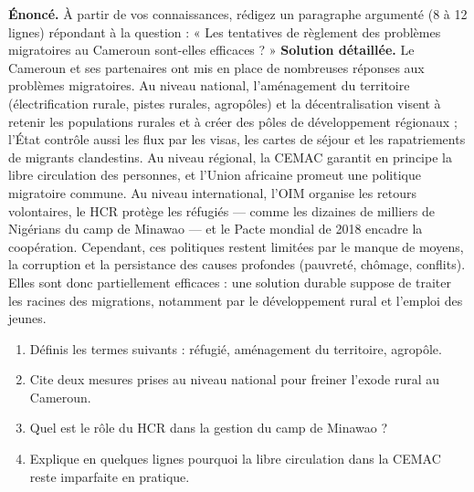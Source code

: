 \documentclass[11pt]{article}
\begin{document}
\begin{exoresolu}
\textbf{Énoncé.} À partir de vos connaissances, rédigez un paragraphe argumenté (8 à 12 lignes) répondant à la question : « Les tentatives de règlement des problèmes migratoires au Cameroun sont-elles efficaces ? »
\tcblower
\textbf{Solution détaillée.} Le Cameroun et ses partenaires ont mis en place de nombreuses réponses aux problèmes migratoires. Au niveau national, l'aménagement du territoire (électrification rurale, pistes rurales, agropôles) et la décentralisation visent à retenir les populations rurales et à créer des pôles de développement régionaux ; l'État contrôle aussi les flux par les visas, les cartes de séjour et les rapatriements de migrants clandestins. Au niveau régional, la CEMAC garantit en principe la libre circulation des personnes, et l'Union africaine promeut une politique migratoire commune. Au niveau international, l'OIM organise les retours volontaires, le HCR protège les réfugiés — comme les dizaines de milliers de Nigérians du camp de Minawao — et le Pacte mondial de 2018 encadre la coopération. Cependant, ces politiques restent limitées par le manque de moyens, la corruption et la persistance des causes profondes (pauvreté, chômage, conflits). Elles sont donc partiellement efficaces : une solution durable suppose de traiter les racines des migrations, notamment par le développement rural et l'emploi des jeunes.
\end{exoresolu}

\begin{exercice}
\begin{enumerate}
\item Définis les termes suivants : réfugié, aménagement du territoire, agropôle.
\item Cite deux mesures prises au niveau national pour freiner l'exode rural au Cameroun.
\item Quel est le rôle du HCR dans la gestion du camp de Minawao ?
\item Explique en quelques lignes pourquoi la libre circulation dans la CEMAC reste imparfaite en pratique.
\end{enumerate}
\end{exercice}
\end{document}
